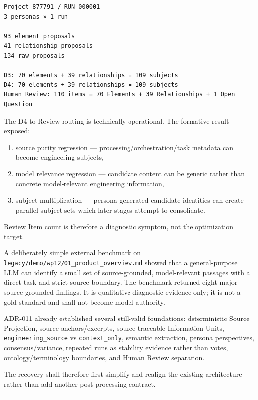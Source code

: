 \begin{verbatim}
Project 877791 / RUN-000001
3 personas × 1 run

93 element proposals
41 relationship proposals
134 raw proposals

D3: 70 elements + 39 relationships = 109 subjects
D4: 70 elements + 39 relationships = 109 subjects
Human Review: 110 items = 70 Elements + 39 Relationships + 1 Open Question
\end{verbatim}

The D4-to-Review routing is technically operational. The formative result exposed:

\begin{enumerate}
\def\labelenumi{\arabic{enumi}.}
\tightlist
\item
  source purity regression --- processing/orchestration/task metadata can become engineering subjects,
\item
  model relevance regression --- candidate content can be generic rather than concrete model-relevant engineering information,
\item
  subject multiplication --- persona-generated candidate identities can create parallel subject sets which later stages attempt to consolidate.
\end{enumerate}

Review Item count is therefore a diagnostic symptom, not the optimization target.

A deliberately simple external benchmark on \texttt{legacy/demo/wp12/01\_product\_overview.md} showed that a general-purpose LLM can identify a small set of source-grounded, model-relevant passages with a direct task and strict source boundary. The benchmark returned eight major source-grounded findings. It is qualitative diagnostic evidence only; it is not a gold standard and shall not become model authority.

ADR-011 already established several still-valid foundations: deterministic Source Projection, source anchors/excerpts, source-traceable Information Units, \texttt{engineering\_source} vs \texttt{context\_only}, semantic extraction, persona perspectives, consensus/variance, repeated runs as stability evidence rather than votes, ontology/terminology boundaries, and Human Review separation.

The recovery shall therefore first simplify and realign the existing architecture rather than add another post-processing contract.

\begin{center}\rule{0.5\linewidth}{0.5pt}\end{center}

